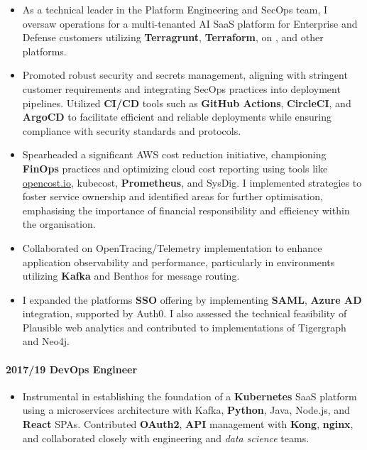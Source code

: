 \documentclass[
]{article}
\providecommand{\tightlist}{%
  \setlength{\itemsep}{0pt}\setlength{\parskip}{0pt}}
\begin{document}
\begin{itemize}
\item
  As a technical leader in the Platform Engineering and SecOps team, I
  oversaw operations for a multi-tenanted AI SaaS platform for
  Enterprise and Defense customers utilizing \textbf{Terragrunt},
  \textbf{Terraform}, on \faAws , and other platforms.
\item
  Promoted robust security and secrets management, aligning with
  stringent customer requirements and integrating SecOps practices into
  deployment pipelines. Utilized \textbf{CI/CD} tools such as \faGithub
  \textbf{GitHub Actions}, \textbf{CircleCI}, and \textbf{ArgoCD} to
  facilitate efficient and reliable deployments while ensuring
  compliance with security standards and protocols.
\item
  Spearheaded a significant AWS cost reduction initiative, championing
  \textbf{FinOps} practices and optimizing cloud cost reporting using
  tools like \href{https://www.opencost.io/}{opencost.io}, kubecost,
  \textbf{Prometheus}, and SysDig. I implemented strategies to foster
  service ownership and identified areas for further optimisation,
  emphasising the importance of financial responsibility and efficiency
  within the organisation.
\item
  Collaborated on OpenTracing/Telemetry implementation to enhance
  application observability and performance, particularly in
  environments utilizing \textbf{Kafka} and Benthos for message routing.
\item
  I expanded the platforms \textbf{SSO} offering by implementing
  \textbf{SAML}, \textbf{Azure AD} integration, supported by Auth0. I
  also assessed the technical feasibility of Plausible web analytics and
  contributed to implementations of Tigergraph and Neo4j.
\end{itemize}

\hypertarget{devops-engineer}{%
\paragraph{2017/19 DevOps Engineer}\label{devops-engineer}}

\begin{itemize}
\tightlist
\item
  Instrumental in establishing the foundation of a \textbf{Kubernetes}
  SaaS platform using a microservices architecture with Kafka,
  \textbf{Python}, Java, Node.js, and \textbf{React} SPAs. Contributed
  \textbf{OAuth2}, \textbf{API} management with \textbf{Kong},
  \textbf{nginx}, and collaborated closely with engineering and
  \emph{data science} teams.
\end{itemize}
\end{document}
